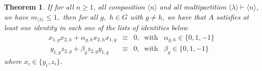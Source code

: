 \documentclass{amsart}
\newtheorem{teorema}{Theorem}[section]
\numberwithin{equation}{section}
\begin{document}
\begin{teorema}\label{teoida}
	If for all $n\geq 1$, all composition $\langle n \rangle$ and all multipartition $\langle \lambda \rangle \vdash \langle n \rangle$, we have $m_{\langle \lambda \rangle}\le 1,$ then for all $g,$ $ h \in G$ with $g \neq h$, %
    we have that
	$A$ satisfies
	at least one identity in each one of the lists of identities below 
$$\begin{array}{lcl} x_{1,g}x_{2,h}+\alpha_{g,h}x_{2,h}x_{1,g}&\equiv& 0, \;\; \mbox{with} \;\;\; \alpha_{g,h} \in \{0, 1, -1\}  \\
    ~ y_{1,g}z_{2,g}+\beta_g z_{2,g} y_{1,g}& \equiv&0, \;\;\mbox{with}\;\;\;\beta_g \in \{0, 1, -1\}\end{array}$$
    where $x_i \in \{y_i, z_i\}$. 
\end{teorema} 
\end{document}
